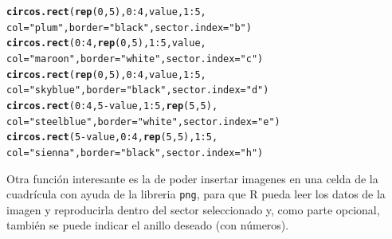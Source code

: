 \documentclass{article}\usepackage[]{graphicx}\usepackage[]{color}
\makeatletter
\newcommand{\hlnum}[1]{\textcolor[rgb]{0.686,0.059,0.569}{#1}}%
\newcommand{\hlstr}[1]{\textcolor[rgb]{0.192,0.494,0.8}{#1}}%
\newcommand{\hlopt}[1]{\textcolor[rgb]{0,0,0}{#1}}%
\newcommand{\hlstd}[1]{\textcolor[rgb]{0.345,0.345,0.345}{#1}}%
\newcommand{\hlkwc}[1]{\textcolor[rgb]{0.333,0.667,0.333}{#1}}%
\newcommand{\hlkwd}[1]{\textcolor[rgb]{0.737,0.353,0.396}{\textbf{#1}}}%
\newenvironment{kframe}{%
 \def\at@end@of@kframe{}%
 \ifinner\ifhmode%
  \def\at@end@of@kframe{\end{minipage}}%
  \begin{minipage}{\columnwidth}%
 \fi\fi%
 \def\FrameCommand##1{\hskip\@totalleftmargin \hskip-\fboxsep
 \colorbox{shadecolor}{##1}\hskip-\fboxsep
     \hskip-\linewidth \hskip-\@totalleftmargin \hskip\columnwidth}%
 \MakeFramed {\advance\hsize-\width
   \@totalleftmargin\z@ \linewidth\hsize
   \@setminipage}}%
 {\par\unskip\endMakeFramed%
 \at@end@of@kframe}
\newenvironment{knitrout}{}{} %
\makeatother
\begin{document}
\begin{knitrout}
\color{fgcolor}\begin{kframe}
\begin{alltt}
\hlkwd{circos.rect}\hlstd{(}\hlkwd{rep}\hlstd{(}\hlnum{0}\hlstd{,} \hlnum{5}\hlstd{),} \hlnum{0}\hlopt{:}\hlnum{4}\hlstd{, value,} \hlnum{1}\hlopt{:}\hlnum{5}\hlstd{,}
                            \hlkwc{col} \hlstd{=} \hlstr{"plum"}\hlstd{,} \hlkwc{border} \hlstd{=} \hlstr{"black"}\hlstd{,} \hlkwc{sector.index} \hlstd{=} \hlstr{"b"}\hlstd{)}
\hlkwd{circos.rect}\hlstd{(} \hlnum{0}\hlopt{:}\hlnum{4}\hlstd{,}\hlkwd{rep}\hlstd{(}\hlnum{0}\hlstd{,} \hlnum{5}\hlstd{),} \hlnum{1}\hlopt{:}\hlnum{5}\hlstd{, value,}
                            \hlkwc{col} \hlstd{=} \hlstr{"maroon"}\hlstd{,} \hlkwc{border} \hlstd{=} \hlstr{"white"}\hlstd{,} \hlkwc{sector.index} \hlstd{=} \hlstr{"c"}\hlstd{)}
\hlkwd{circos.rect}\hlstd{(}\hlkwd{rep}\hlstd{(}\hlnum{0}\hlstd{,} \hlnum{5}\hlstd{),} \hlnum{0}\hlopt{:}\hlnum{4}\hlstd{, value,} \hlnum{1}\hlopt{:}\hlnum{5}\hlstd{,}
                            \hlkwc{col} \hlstd{=} \hlstr{"skyblue"}\hlstd{,} \hlkwc{border} \hlstd{=} \hlstr{"black"}\hlstd{,} \hlkwc{sector.index} \hlstd{=} \hlstr{"d"}\hlstd{)}
\hlkwd{circos.rect}\hlstd{(} \hlnum{0}\hlopt{:}\hlnum{4}\hlstd{,} \hlnum{5}\hlopt{-}\hlstd{value,} \hlnum{1}\hlopt{:}\hlnum{5}\hlstd{,} \hlkwd{rep}\hlstd{(}\hlnum{5}\hlstd{,} \hlnum{5}\hlstd{),}
                            \hlkwc{col} \hlstd{=} \hlstr{"steelblue"}\hlstd{,} \hlkwc{border} \hlstd{=} \hlstr{"white"}\hlstd{,} \hlkwc{sector.index} \hlstd{=} \hlstr{"e"}\hlstd{)}
\hlkwd{circos.rect}\hlstd{(}\hlnum{5}\hlopt{-}\hlstd{value,} \hlnum{0}\hlopt{:}\hlnum{4}\hlstd{,} \hlkwd{rep}\hlstd{(}\hlnum{5}\hlstd{,} \hlnum{5}\hlstd{),} \hlnum{1}\hlopt{:}\hlnum{5}\hlstd{,}
                            \hlkwc{col} \hlstd{=} \hlstr{"sienna"}\hlstd{,} \hlkwc{border} \hlstd{=} \hlstr{"black"}\hlstd{,} \hlkwc{sector.index} \hlstd{=} \hlstr{"h"}\hlstd{)}
\end{alltt}
\end{kframe}
\end{knitrout}
Otra funci\'on interesante es la de poder insertar imagenes en una celda de la cuadr\'icula con ayuda de la libreria \texttt{png}, para que R pueda leer los datos de la imagen y reproducirla dentro del sector seleccionado y, como parte opcional, tambi\'en se puede indicar el anillo deseado (con n\'umeros).
\end{document}
